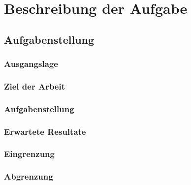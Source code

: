 \chapter{Beschreibung der Aufgabe}

\section{Aufgabenstellung}

\subsection{Ausgangslage}

\subsection{Ziel der Arbeit}

\subsection{Aufgabenstellung}

\subsection{Erwartete Resultate}

\subsection{Eingrenzung}

\subsection{Abgrenzung}

